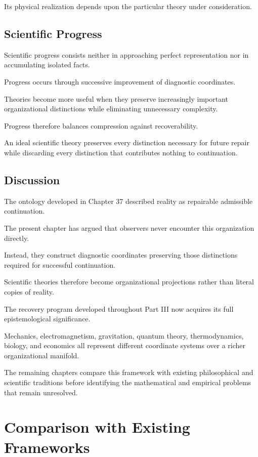 \documentclass[11pt,oneside]{book}
\numberwithin{equation}{chapter}
\theoremstyle{definition}
\theoremstyle{plain}
\begin{document}
Its physical realization depends upon the particular theory under
consideration.

\section{Scientific Progress}

Scientific progress consists neither in approaching perfect representation
nor in accumulating isolated facts.

Progress occurs through successive improvement of diagnostic coordinates.

Theories become more useful when they preserve increasingly important
organizational distinctions while eliminating unnecessary complexity.

Progress therefore balances compression against recoverability.

An ideal scientific theory preserves every distinction necessary for future
repair while discarding every distinction that contributes nothing to
continuation.

\section{Discussion}

The ontology developed in Chapter 37 described reality as repairable
admissible continuation.

The present chapter has argued that observers never encounter this
organization directly.

Instead, they construct diagnostic coordinates preserving those
distinctions required for successful continuation.

Scientific theories therefore become organizational projections rather
than literal copies of reality.

The recovery program developed throughout Part III now acquires its full
epistemological significance.

Mechanics, electromagnetism, gravitation, quantum theory, thermodynamics,
biology, and economics all represent different coordinate systems over a
richer organizational manifold.

The remaining chapters compare this framework with existing philosophical
and scientific traditions before identifying the mathematical and empirical
problems that remain unresolved.

\chapter{Comparison with Existing Frameworks}
\end{document}
